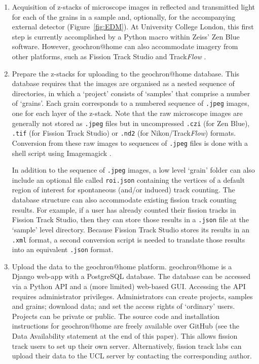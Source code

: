 \documentclass[gchron, manuscript]{copernicus}
\begin{document}
\begin{enumerate}
\item Acquisition of z-stacks of microscope images in reflected and
  transmitted light for each of the grains in a sample and,
  optionally, for the accompanying external detector
  (Figure~\ref{fig:EDM}). At University College London, this first
  step is currently accomplished by a Python macro within Zeiss' Zen
  Blue software.  However, geochron@home can also accommodate imagery
  from other platforms, such as Fission Track Studio
  \citep[Zeiss;][]{gleadow2009} and Track\emph{Flow}
  \citep[Nikon;][]{vanranst2019}.

\item Prepare the z-stacks for uploading to the geochron@home
  database. This database requires that the images are organised as a
  nested sequence of directories, in which a `project' consists of
  `samples' that comprise a number of `grains'.  Each grain
  corresponds to a numbered sequence of \texttt{.jpeg} images, one for
  each layer of the z-stack. Note that the raw microscope images are
  generally not stored as \texttt{.jpeg} files but in uncompressed
  \texttt{.czi} (for Zen Blue), \texttt{.tif} (for Fission Track
  Studio) or \texttt{.nd2} (for Nikon/Track\emph{Flow})
  formats. Conversion from these raw images to sequences of
  \texttt{.jpeg} files is done with a shell script using Imagemagick
  \citep{still2006}.\medskip

  In addition to the sequence of \texttt{.jpeg} images, a low level
  `grain' folder can also include an optional file called
  \texttt{roi.json} containing the vertices of a default region of
  interest for spontaneous (and/or induced) track counting. The
  database structure can also accommodate existing fission track
  counting results.  For example, if a user has already counted their
  fission tracks in Fission Track Studio, then they can store those
  results in a \texttt{.json} file at the `sample' level
  directory. Because Fission Track Studio stores its results in an
  \texttt{.xml} format, a second conversion script is needed to
  translate those results into an equivalent \texttt{.json} format.

\item Upload the data to the geochron@home platform. geochron@home is
  a Django web-app with a PostgreSQL database.  The database can be
  accessed via a Python API and a (more limited) web-based
  GUI. Accessing the API requires administrator
  privileges. Administrators can create projects, samples and grains;
  download data; and set the access rights of `ordinary' users.
  Projects can be private or public. The source code and installation
  instructions for geochron@home are freely available over GitHub (see
  the Data Availability statement at the end of this paper). This
  allows fission track users to set up their own
  server. Alternatively, fission track labs can upload their data to
  the UCL server by contacting the corresponding author.


\end{enumerate}
\end{document}

